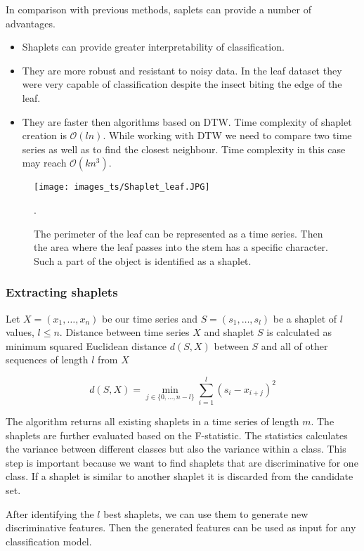 \documentclass[thesis=M,english]{FITthesis}[2019/12/23]
\begin{document}
In comparison with previous methods, saplets can provide a number of advantages.
\begin{itemize}
		\item Shaplets can provide greater interpretability of classification.
		\item They are more robust and resistant to noisy data. In the leaf dataset they were very capable of classification despite the insect biting the edge of the leaf.
		\item They are faster then algorithms based on DTW. Time complexity of shaplet creation is $\mathcal{O}(ln)$. While working with DTW we need to compare two time series as well as to find the closest neighbour. Time complexity in this case may reach $\mathcal{O}(kn^3)$.
	\end{itemize}


\begin{figure}[ht!]
    \centering
    \texttt{[image: images\_ts/Shaplet\_leaf.JPG]}
    \caption{The perimeter of the leaf can be represented as a time series. Then the area where the leaf passes into the stem has a specific character. Such a part of the object is identified as a shaplet\cite{learning_shaplet_leaf_img}.}. 
    \label{fig:shaplet_picture}
\end{figure}

\subsubsection{Extracting shaplets}
Let $X = (x_1, \dots, x_n)$ be our time series and $S = (s_1,\dots ,s_l)$ be a shaplet of $l$ values, $l\leq n$. Distance between time series $X$ and shaplet $S$ is calculated as minimum squared Euclidean distance $d(S,X)$ between $S$ and all of other sequences of length $l$ from $X$

\begin{equation*}
d(S,X) = \min_{j \in \{0,\dots, n-l\}} \sum_{i=1}^{l}(s_i - x_{i+j})^2
\end{equation*}

The algorithm returns all existing shaplets in a time series of length $m$. The shaplets are further evaluated based on the F-statistic. The statistics calculates the variance between different classes but also the variance within a class. This step is important because we want to find shaplets that are discriminative for one class. If a shaplet is similar to another shaplet it is discarded from the candidate set.

After identifying the $l$ best shaplets, we can use them to generate new discriminative features. Then the generated features can be used as input for any classification model.
\end{document}
